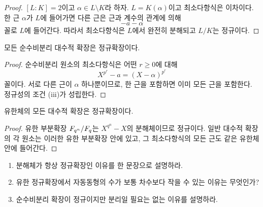 \begin{proof}
$[L:K]=2$이고 $\alpha\in L\setminus K$라 하자. $L=K(\alpha)$이고 최소다항식은 이차이다. 한 근 $\alpha$가 $L$에 들어가면 다른 근은 근과 계수의 관계에 의해
\[
  -a-\alpha
\]
꼴로 $L$에 들어간다. 따라서 최소다항식은 $L$에서 완전히 분해되고 $L/K$는 정규이다.
\end{proof}

\begin{proposition}
모든 순수비분리 대수적 확장은 정규확장이다.
\end{proposition}

\begin{proof}
순수비분리 원소의 최소다항식은 어떤 $r\ge0$에 대해
\[
  X^{p^r}-a=(X-\alpha)^{p^r}
\]
꼴이다. 서로 다른 근이 $\alpha$ 하나뿐이므로, 한 근을 포함하면 이미 모든 근을 포함한다. 정규성의 조건 (iii)가 성립한다.
\end{proof}

\begin{proposition}
유한체의 모든 대수적 확장은 정규확장이다.
\end{proposition}

\begin{proof}
유한 부분확장 $F_{q^n}/F_q$는 $X^{q^n}-X$의 분해체이므로 정규이다. 일반 대수적 확장의 각 원소는 이러한 유한 부분확장 안에 있고, 그 최소다항식의 모든 근도 같은 유한체 안에 들어간다.
\end{proof}

\begin{checkpoint}
\begin{enumerate}[label=(\alph*)]
  \item 분해체가 항상 정규확장인 이유를 한 문장으로 설명하라.
  \item 유한 정규확장에서 자동동형의 수가 보통 차수보다 작을 수 있는 이유는 무엇인가?
  \item 순수비분리 확장이 정규이지만 분리일 필요는 없는 이유를 설명하라.
\end{enumerate}
\end{checkpoint}
